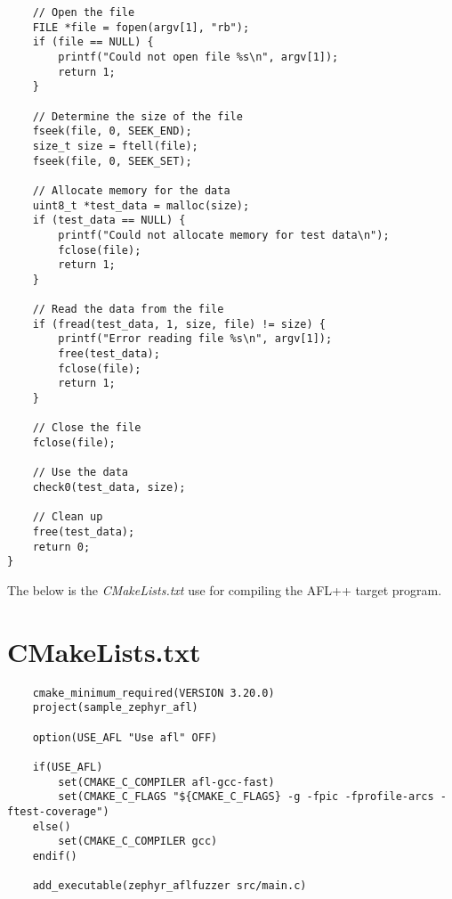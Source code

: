 \begin{verbatim}
    // Open the file
    FILE *file = fopen(argv[1], "rb");
    if (file == NULL) {
        printf("Could not open file %s\n", argv[1]);
        return 1;
    }

    // Determine the size of the file
    fseek(file, 0, SEEK_END);
    size_t size = ftell(file);
    fseek(file, 0, SEEK_SET);

    // Allocate memory for the data
    uint8_t *test_data = malloc(size);
    if (test_data == NULL) {
        printf("Could not allocate memory for test data\n");
        fclose(file);
        return 1;
    }

    // Read the data from the file
    if (fread(test_data, 1, size, file) != size) {
        printf("Error reading file %s\n", argv[1]);
        free(test_data);
        fclose(file);
        return 1;
    }

    // Close the file
    fclose(file);

    // Use the data
    check0(test_data, size);

    // Clean up
    free(test_data);
    return 0;
}

\end{verbatim}
\label{lst:main_program_afl}

\pagebreak

The below is the \textit{CMakeLists.txt} use for compiling the
AFL++ target program.
\section*{CMakeLists.txt}
\begin{verbatim}
    cmake_minimum_required(VERSION 3.20.0)
    project(sample_zephyr_afl)

    option(USE_AFL "Use afl" OFF)

    if(USE_AFL)
        set(CMAKE_C_COMPILER afl-gcc-fast)
        set(CMAKE_C_FLAGS "${CMAKE_C_FLAGS} -g -fpic -fprofile-arcs -ftest-coverage")
    else()
        set(CMAKE_C_COMPILER gcc)
    endif()

    add_executable(zephyr_aflfuzzer src/main.c)
    \end{verbatim}
    \label{lst:cmake_list_txt_afl}